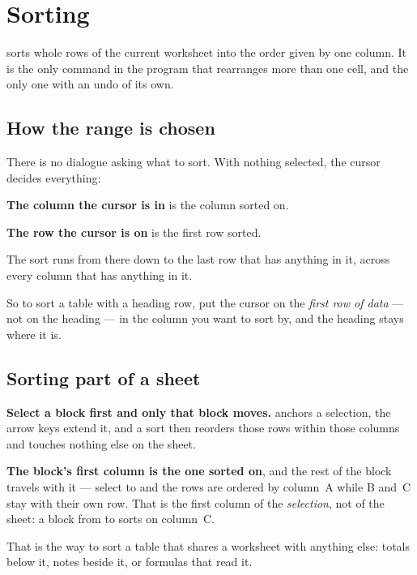 \chapter{Sorting}
\label{ch:sorting}

\ccprod{} sorts whole rows of the current worksheet into the order given by one
column. It is the only command in the program that rearranges more than one
cell, and the only one with an undo of its own.

\section{How the range is chosen}

There is no dialogue asking what to sort. With nothing selected, the cursor
decides everything:

\begin{ccsteps}
\item \textbf{The column the cursor is in} is the column sorted on.
\item \textbf{The row the cursor is on} is the first row sorted.
\item The sort runs from there down to the last row that has anything in it,
across every column that has anything in it.
\end{ccsteps}

So to sort a table with a heading row, put the cursor on the \emph{first row of
data} --- not on the heading --- in the column you want to sort by, and the
heading stays where it is.

\section{Sorting part of a sheet}

\textbf{Select a block first and only that block moves.}  anchors
a selection, the arrow keys extend it, and a sort then reorders those rows
within those columns and touches nothing else on the sheet.

\textbf{The block's first column is the one sorted on}, and the rest of the
block travels with it --- select  to  and the rows
are ordered by column~A while B and~C stay with their own row. That is the
first column of the \emph{selection}, not of the sheet: a block from
 to  sorts on column~C.

That is the way to sort a table that shares a worksheet with anything else:
totals below it, notes beside it, or formulas that read it.

